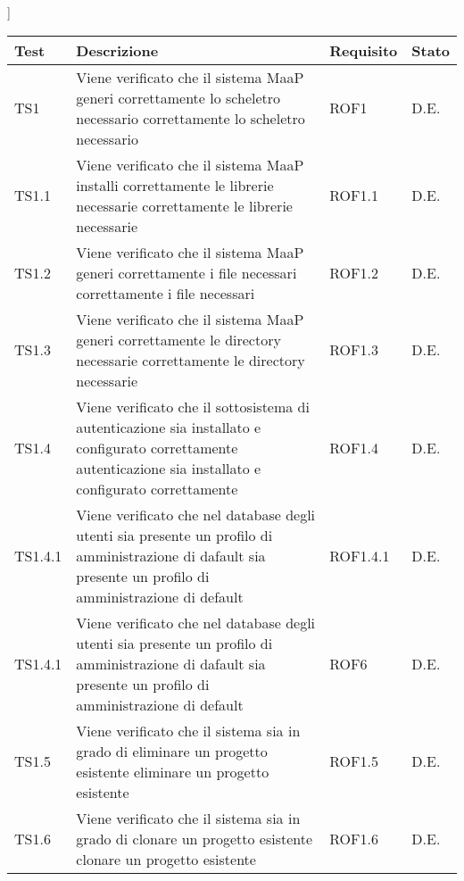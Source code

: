 ]

\begin{center}
\begin{longtable}{|p{2cm}|p{7cm}|p{2cm}|p{2cm}|}
\toprule
\textbf{Test} & \textbf{Descrizione} & \textbf{Requisito} & \textbf{Stato}\\

\midrule
TS1
& Viene verificato che il sistema MaaP generi correttamente lo scheletro necessario
correttamente lo scheletro necessario
& ROF1
& D.E.\\


\midrule
TS1.1
& Viene verificato che il sistema MaaP installi correttamente le librerie necessarie
correttamente le librerie necessarie
& ROF1.1
& D.E.\\


\midrule
TS1.2
& Viene verificato che il sistema MaaP generi correttamente i file necessari
correttamente i file necessari
& ROF1.2
& D.E.\\


\midrule
TS1.3
& Viene verificato che il sistema MaaP generi correttamente le directory necessarie
correttamente le directory necessarie
& ROF1.3
& D.E.\\


\midrule
TS1.4
& Viene verificato che il sottosistema di autenticazione sia installato e configurato correttamente
autenticazione sia installato e configurato
correttamente
& ROF1.4
& D.E.\\


\midrule
TS1.4.1
& Viene verificato che nel database degli utenti sia presente un profilo di amministrazione di dafault
sia presente un profilo di amministrazione di
default
& ROF1.4.1
& D.E.\\


\midrule
TS1.4.1
& Viene verificato che nel database degli utenti sia presente un profilo di amministrazione di dafault
sia presente un profilo di amministrazione di
default
& ROF6
& D.E.\\


\midrule
TS1.5
& Viene verificato che il sistema sia in grado di eliminare un progetto esistente
eliminare un progetto esistente
& ROF1.5
& D.E.\\


\midrule
TS1.6
& Viene verificato che il sistema sia in grado di clonare un progetto esistente
clonare un progetto esistente
& ROF1.6
& D.E.\\



\end{longtable}
\end{center}
